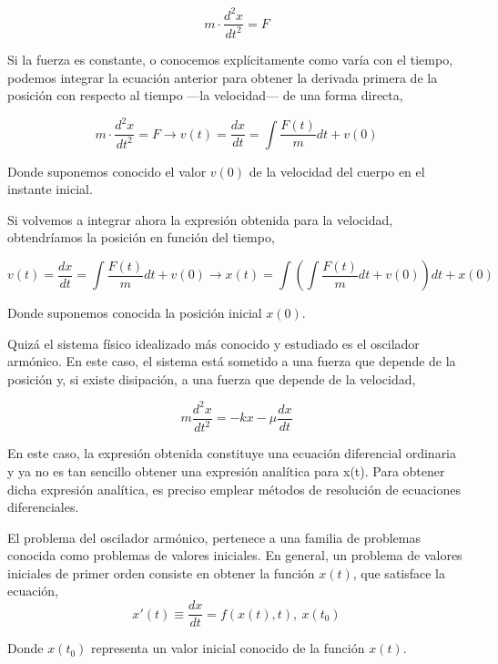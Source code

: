 \begin{equation*}
m\cdot \frac{d^2x}{dt^2}=F
\end{equation*}

Si la fuerza es constante, o conocemos explícitamente como varía con el tiempo, podemos integrar la ecuación anterior para obtener la derivada primera de la posición con respecto al tiempo ---la velocidad--- de una forma directa,

\begin{equation*}
m\cdot \frac{d^2x}{dt^2}=F \rightarrow v(t)=\frac{dx}{dt}=\int \frac{F(t)}{m}dt +v(0)
\end{equation*}

Donde suponemos conocido el valor $v(0)$ de la velocidad del cuerpo en el instante inicial.

Si volvemos a integrar ahora la expresión obtenida para la velocidad, obtendríamos la posición en función del tiempo,

\begin{equation*}
v(t)=\frac{dx}{dt}=\int \frac{F(t)}{m}dt +v(0)\rightarrow x(t)=\int\left(\int \frac{F(t)}{m}dt +v(0)\right)dt+x(0)
\end{equation*}

Donde suponemos conocida la posición inicial $x(0)$.

Quizá el sistema físico idealizado más conocido y estudiado es el oscilador armónico. En este caso, el sistema está sometido a una fuerza que depende de la posición y, si existe disipación, a una fuerza que depende de la velocidad,

\begin{equation*}
m\frac{d^2x}{dt^2}=-kx-\mu \frac{dx}{dt}
\end{equation*}

En este caso, la expresión obtenida constituye una ecuación diferencial ordinaria y ya no es tan sencillo obtener una expresión analítica para x(t). Para obtener dicha expresión analítica, es preciso emplear métodos de resolución de ecuaciones diferenciales.

El problema del oscilador armónico, pertenece a una familia de problemas conocida como problemas de valores iniciales. En general, un problema de valores iniciales de primer orden consiste en obtener la función $x(t)$, que satisface la ecuación,
\begin{equation*}
x'(t)\equiv \frac{dx}{dt}=f(x(t),t), \ x(t_0)
\end{equation*}

Donde $x(t_0)$ representa un valor inicial conocido de la función $x(t)$.

